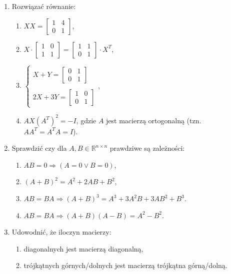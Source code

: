 \documentclass{article}
\begin{document}
\begin{enumerate}
    \item Rozwiązać równanie:
    \begin{enumerate}
        \item $XX = \begin{bmatrix} 1 & 4\\  0 & 1 \end{bmatrix}$,
        \item $X \cdot \begin{bmatrix} 1 & 0\\  1 & 1 \end{bmatrix} = \begin{bmatrix} 1 & 1\\  0 & 1 \end{bmatrix} \cdot X^{T}$,
        \item $\left\{ \begin{array}{r} X + Y = \begin{bmatrix} 0 & 1\\  0 & 1 \end{bmatrix} \\ \\ 2X + 3Y = \begin{bmatrix} 1 & 0\\  0 & 1 \end{bmatrix} \end{array}\right.$,
        \item $AX(A^{T})^{2} = -I$, gdzie $A$ jest macierzą ortogonalną (tzn. $AA^{T} = A^{T}A = I$).
    \end{enumerate}

    \item Sprawdzić czy dla $A, B \in \mathbb{R}^{n \times n}$ prawdziwe są zależności:
    \begin{enumerate}
        \item $AB = 0 \Rightarrow (A = 0 \lor B = 0)$,
        \item $(A+B)^2 = A^{2} + 2AB + B^{2}$,
        \item $AB = BA \Rightarrow (A+B)^{3} = A^{3} + 3A^{2}B + 3AB^{2} + B^{3}$.
        \item $AB = BA \Rightarrow (A+B)(A-B) = A^{2} - B^{2}$.
    \end{enumerate}

    \item Udowodnić, że iloczyn macierzy:
    \begin{enumerate}
        \item diagonalnych jest macierzą diagonalną,
        \item trójkątnych górnych/dolnych jest macierzą trójkątna górną/dolną.
    \end{enumerate}


\end{enumerate}
\end{document}
